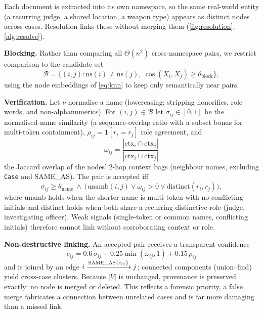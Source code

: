 \documentclass[conference]{IEEEtran}
\newcommand{\rel}[1]{\textup{\MakeUppercase{#1}}}
\newcommand{\node}[1]{\texttt{#1}}
\begin{document}
Each document is extracted into its own namespace, so the same real-world
entity (a recurring judge, a shared location, a weapon type) appears as
distinct nodes across cases. Resolution links these without merging them
(\cref{fig:resolution}, \cref{alg:resolve}).

\textbf{Blocking.} Rather than comparing all $\Theta(n^2)$ cross-namespace pairs,
we restrict comparison to the candidate set
\begin{equation}
\mathcal{B}=\big\{(i,j): \mathrm{ns}(i)\neq\mathrm{ns}(j),\ \cos(X_i,X_j)\ge\theta_{\text{block}}\big\},
\label{eq:block}
\end{equation}
using the node embeddings of \cref{eq:knn} to keep only semantically near pairs.

\textbf{Verification.} Let $\nu$ normalise a name (lowercasing; stripping
honorifics, role words, and non-alphanumerics). For $(i,j)\in\mathcal{B}$ let
$\sigma_{ij}\in[0,1]$ be the normalised-name similarity (a sequence-overlap ratio
with a subset bonus for multi-token containment), $\rho_{ij}=\mathbf{1}[r_i=r_j]$
role agreement, and
\begin{equation}
\omega_{ij}=\frac{|\mathrm{ctx}_i\cap\mathrm{ctx}_j|}{|\mathrm{ctx}_i\cup\mathrm{ctx}_j|}
\label{eq:jaccard}
\end{equation}
the Jaccard overlap of the nodes' 2-hop context bags (neighbour names, excluding
\node{Case} and \rel{same\_as}). The pair is accepted iff
\begin{equation}
\sigma_{ij}\ge\theta_{\text{name}}\ \wedge\ \big(\mathrm{unamb}(i,j)\vee\omega_{ij}>0\vee\mathrm{distinct}(r_i,r_j)\big),
\label{eq:accept}
\end{equation}
where $\mathrm{unamb}$ holds when the shorter name is multi-token with no
conflicting initials and $\mathrm{distinct}$ holds when both share a recurring
distinctive role (judge, investigating officer). Weak signals (single-token or
common names, conflicting initials) therefore cannot link without corroborating
context or role.

\textbf{Non-destructive linking.} An accepted pair receives a transparent
confidence
\begin{equation}
c_{ij}=0.6\,\sigma_{ij}+0.25\min(\omega_{ij},1)+0.15\,\rho_{ij}
\label{eq:conf}
\end{equation}
and is joined by an edge $i\xrightarrow{\rel{same\_as}\{c_{ij}\}}j$; connected
components (union--find) yield cross-case clusters. Because $|V|$ is unchanged,
provenance is preserved exactly: no node is merged or deleted. This reflects a
forensic priority, a false merge fabricates a connection between unrelated cases
and is far more damaging than a missed link.
\end{document}

